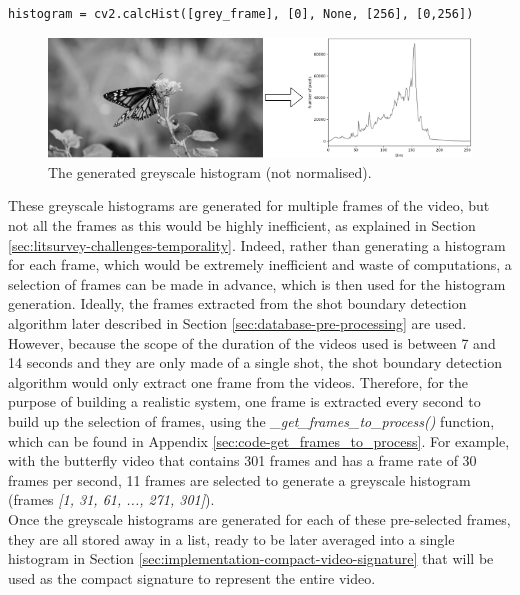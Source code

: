 \begin{lstlisting}[numbers=none]
histogram = cv2.calcHist([grey_frame], [0], None, [256], [0,256])
\end{lstlisting}

\begin{figure}[h] 
\centerline{\includegraphics[width=\textwidth]{figures/implementation/greyscale_not_normalised.png}}
\caption{\label{fig:implementation-greyscale_not_normalised}The generated greyscale histogram (not normalised).}
\end{figure}

These greyscale histograms are generated for multiple frames of the video, but not all the frames as this would be highly inefficient, as explained in Section \ref{sec:litsurvey-challenges-temporality}. Indeed, rather than generating a histogram for each frame, which would be extremely inefficient and waste of computations, a selection of frames can be made in advance, which is then used for the histogram generation. Ideally, the frames extracted from the shot boundary detection algorithm later described in Section \ref{sec:database-pre-processing} are used. However, because the scope of the duration of the videos used is between 7 and 14 seconds and they are only made of a single shot, the shot boundary detection algorithm would only extract one frame from the videos. Therefore, for the purpose of building a realistic system, one frame is extracted every second to build up the selection of frames, using the \textit{\_get\_frames\_to\_process()} function, which can be found in Appendix \ref{sec:code-get_frames_to_process}. For example, with the butterfly video that contains 301 frames and has a frame rate of 30 frames per second, 11 frames are selected to generate a greyscale histogram (frames \textit{[1, 31, 61, ..., 271, 301]}).\\

Once the greyscale histograms are generated for each of these pre-selected frames, they are all stored away in a list, ready to be later averaged into a single histogram in Section \ref{sec:implementation-compact-video-signature} that will be used as the compact signature to represent the entire video.

